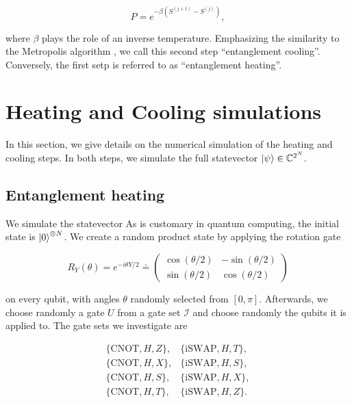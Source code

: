 \documentclass[reprint,amsmath,amssymb,aps,prb,nofootinbib]{revtex4-2}
\begin{document}
    \begin{equation}
        P = e^{-\beta(S^{(j+1)}-S^{(j)})},
        \label{theory:eq:metropolis_update}
    \end{equation}

    where $\beta$ plays the role of an inverse temperature. Emphasizing the similarity to the Metropolis algorithm
    \cite{Metropolis:1953:EquationsOfState}, we call this second step ``entanglement cooling''. Conversely,
    the first setp is referred to as ``entanglement heating''.

    \section{Heating and Cooling simulations}
    \label{sec:simulation}

    In this section, we give details on the numerical simulation of the heating and cooling steps.
    In both steps, we simulate the full statevector $\ket{\psi}\in\mathbb{C}^{2^N}$.

    \vspace{\baselineskip}

    \subsection{Entanglement heating}
    \label{sec:simulation:heating}

    We simulate the statevector As is customary in quantum computing, the initial state is $\ket{0}^{\otimes N}$.
    We create a random product state by applying the rotation gate

    \begin{equation}
        R_Y(\theta) = e^{-i\theta Y/2} \doteq \left(\begin{array}{cc}
            \cos(\theta/2) & -\sin(\theta/2) \\ \sin(\theta/2) & \cos(\theta/2)
        \end{array}\right)
    \end{equation}

    on every qubit, with angles $\theta$ randomly selected from $[0,\pi]$. Afterwards, we choose randomly a gate
    $U$ from a gate set $\mathcal{I}$ and choose randomly the qubits it is applied to. The gate sets we investigate
    are

    \begin{equation}
        \begin{array}{cc}
            \{\text{CNOT},H,Z\}, & \{\text{iSWAP},H,T\}, \\
            \{\text{CNOT},H,X\}, & \{\text{iSWAP},H,S\}, \\
            \{\text{CNOT},H,S\}, & \{\text{iSWAP},H,X\}, \\
            \{\text{CNOT},H,T\}, & \{\text{iSWAP},H,Z\}.
        \end{array}
    \end{equation}
\end{document}

